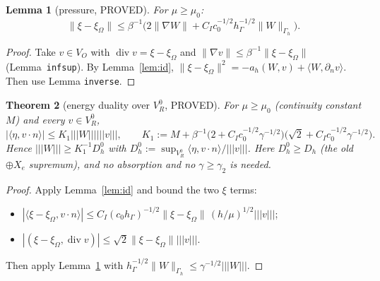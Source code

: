 \documentclass[11pt]{article}
\newtheorem{theorem}{Theorem}[section]
\newtheorem{lemma}[theorem]{Lemma}
\theoremstyle{remark}
\newcommand{\tn}[1]{|\!|\!|#1|\!|\!|}
\newcommand{\hG}{h_\Gamma}
\newcommand{\Gh}{\Gamma_h}
\newcommand{\ip}[2]{\langle #1,#2\rangle}
\begin{document}
\begin{lemma}[pressure, PROVED]\label{lem:xi}
For $\mu\ge\mu_0$:
\[
\|\xi-\xi_\Omega\|\le\beta^{-1}\big(2\|\nabla W\|+C_Ic_0^{-1/2}\hG^{-1/2}\|W\|_{\Gh}\big).
\]
\end{lemma}
\begin{proof}
Take $v\in V_O$ with $\operatorname{div}v=\xi-\xi_\Omega$ and $\|\nabla v\|\le\beta^{-1}\|\xi-\xi_\Omega\|$
(Lemma~\texttt{infsup}). By Lemma~\ref{lem:id}, $\|\xi-\xi_\Omega\|^2=-a_h(W,v)+\ip{W}{\partial_nv}$. Then use Lemma
\texttt{inverse}.
\end{proof}

\begin{theorem}[energy duality over $V_R^0$, PROVED]\label{thm:energy}
For $\mu\ge\mu_0$ (continuity constant $M$) and every $v\in V_R^0$,
\[
|\ip{\eta}{v\cdot n}|\le K_1\tn W\tn v,\qquad
K_1:=M+\beta^{-1}\big(2+C_Ic_0^{-1/2}\gamma^{-1/2}\big)\big(\sqrt2+C_Ic_0^{-1/2}\gamma^{-1/2}\big).
\]
Hence $\tn W\ge K_1^{-1}D^0_h$ with $D^0_h:=\sup_{V_R^0}\ip{\eta}{v\cdot n}/\tn v$. Here $D_h^0\ge D_h$ (the old $\oplus X_e$
supremum), and no absorption and no $\gamma\ge\gamma_2$ is needed.
\end{theorem}
\begin{proof}
Apply Lemma~\ref{lem:id} and bound the two $\xi$ terms:
\begin{itemize}
\item $|\ip{\xi-\xi_\Omega}{v\cdot n}|\le C_I(c_0\hG)^{-1/2}\|\xi-\xi_\Omega\|\,(h/\mu)^{1/2}\tn v$;
\item $|(\xi-\xi_\Omega,\operatorname{div}v)|\le\sqrt2\|\xi-\xi_\Omega\|\tn v$.
\end{itemize}
Then apply Lemma~\ref{lem:xi} with $\hG^{-1/2}\|W\|_{\Gh}\le\gamma^{-1/2}\tn W$.
\end{proof}
\end{document}
